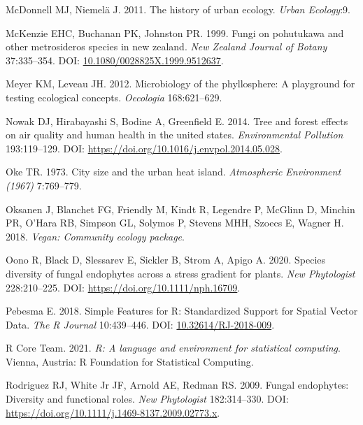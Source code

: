\documentclass[fleqn,10pt,lineno]{wlpeerj} %
\newlength{\cslhangindent}
\newenvironment{CSLReferences}[2] %
 {%
  \setlength{\parindent}{0pt}
  \ifodd #1 \everypar{\setlength{\hangindent}{\cslhangindent}}\ignorespaces\fi
  \ifnum #2 > 0
  \setlength{\parskip}{#2\baselineskip}
  \fi
 }%
 {}
\begin{document}
\begin{CSLReferences}{1}{0}
\leavevmode{}%
McDonnell MJ, Niemelä J. 2011. The history of urban ecology. \emph{Urban Ecology}:9.

\leavevmode{}%
McKenzie EHC, Buchanan PK, Johnston PR. 1999. Fungi on pohutukawa and other metrosideros species in new zealand. \emph{New Zealand Journal of Botany} 37:335--354. DOI: \href{https://doi.org/10.1080/0028825X.1999.9512637}{10.1080/0028825X.1999.9512637}.

\leavevmode{}%
Meyer KM, Leveau JH. 2012. Microbiology of the phyllosphere: A playground for testing ecological concepts. \emph{Oecologia} 168:621--629.

\leavevmode{}%
Nowak DJ, Hirabayashi S, Bodine A, Greenfield E. 2014. Tree and forest effects on air quality and human health in the united states. \emph{Environmental Pollution} 193:119--129. DOI: \url{https://doi.org/10.1016/j.envpol.2014.05.028}.

\leavevmode{}%
Oke TR. 1973. City size and the urban heat island. \emph{Atmospheric Environment (1967)} 7:769--779.

\leavevmode{}%
Oksanen J, Blanchet FG, Friendly M, Kindt R, Legendre P, McGlinn D, Minchin PR, O'Hara RB, Simpson GL, Solymos P, Stevens MHH, Szoecs E, Wagner H. 2018. \emph{Vegan: Community ecology package}.

\leavevmode{}%
Oono R, Black D, Slessarev E, Sickler B, Strom A, Apigo A. 2020. Species diversity of fungal endophytes across a stress gradient for plants. \emph{New Phytologist} 228:210--225. DOI: \url{https://doi.org/10.1111/nph.16709}.

\leavevmode{}%
Pebesma E. 2018. {Simple Features for R: Standardized Support for Spatial Vector Data}. \emph{{The R Journal}} 10:439--446. DOI: \href{https://doi.org/10.32614/RJ-2018-009}{10.32614/RJ-2018-009}.

\leavevmode{}%
R Core Team. 2021. \emph{R: A language and environment for statistical computing}. Vienna, Austria: R Foundation for Statistical Computing.

\leavevmode{}%
Rodriguez RJ, White Jr JF, Arnold AE, Redman RS. 2009. Fungal endophytes: Diversity and functional roles. \emph{New Phytologist} 182:314--330. DOI: \url{https://doi.org/10.1111/j.1469-8137.2009.02773.x}.


\end{CSLReferences}
\end{document}
